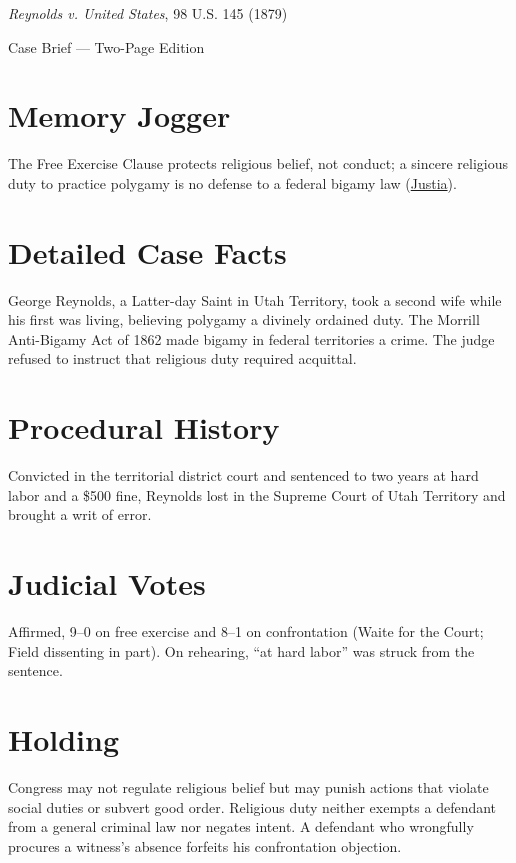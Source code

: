 \documentclass[12pt]{article}
\begin{document}
\begin{center}
{\LARGE \textit{Reynolds v. United States}, 98 U.S. 145 (1879)\par}
\vspace{0.5em}
{\large Case Brief --- Two-Page Edition\par}
\end{center}

\section{Memory Jogger}
The Free Exercise Clause protects religious belief, not conduct; a sincere religious duty to practice polygamy is no defense to a federal bigamy law (\href{https://supreme.justia.com/cases/federal/us/98/145/}{Justia}).

\section{Detailed Case Facts}
George Reynolds, a Latter-day Saint in Utah Territory, took a second wife while his first was living, believing polygamy a divinely ordained duty. The Morrill Anti-Bigamy Act of 1862 made bigamy in federal territories a crime. The judge refused to instruct that religious duty required acquittal.

\section{Procedural History}
Convicted in the territorial district court and sentenced to two years at hard labor and a \$500 fine, Reynolds lost in the Supreme Court of Utah Territory and brought a writ of error.

\section{Judicial Votes}
Affirmed, 9--0 on free exercise and 8--1 on confrontation (Waite for the Court; Field dissenting in part). On rehearing, ``at hard labor'' was struck from the sentence.

\section{Holding}
Congress may not regulate religious belief but may punish actions that violate social duties or subvert good order. Religious duty neither exempts a defendant from a general criminal law nor negates intent. A defendant who wrongfully procures a witness's absence forfeits his confrontation objection.
\end{document}
